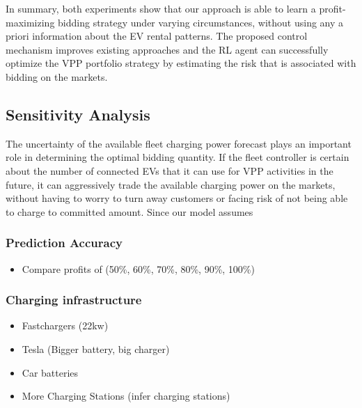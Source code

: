 \documentclass[a4paper, 12pt]{article}
\begin{document}
In summary, both experiments show that our approach is able to learn a
profit-maximizing bidding strategy under varying circumstances, without using
any a priori information about the EV rental patterns. The proposed control
mechanism improves existing approaches and the RL agent can successfully
optimize the VPP portfolio strategy by estimating the risk that is associated
with bidding on the markets.

\subsection{Sensitivity Analysis}
\label{sec:org25a0747}
The uncertainty of the available fleet charging power forecast plays an
important role in determining the optimal bidding quantity. If the fleet
controller is certain about the number of connected EVs that it can use for VPP
activities in the future, it can aggressively trade the available charging power
on the markets, without having to worry to turn away customers or facing risk of
not being able to charge to committed amount. Since our model assumes


\subsubsection{Prediction Accuracy}
\label{sec:orgcf808d2}
\begin{itemize}
\item Compare profits of (50\%, 60\%, 70\%, 80\%, 90\%, 100\%)
\end{itemize}

\subsubsection{Charging infrastructure}
\label{sec:org2540bae}
\begin{itemize}
\item Fastchargers (22kw)
\item Tesla (Bigger battery, big charger)
\item Car batteries
\item More Charging Stations (infer charging stations)
\end{itemize}

\clearpage
\end{document}
